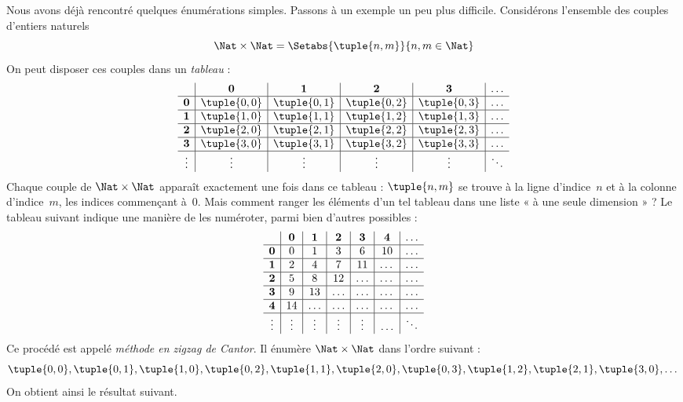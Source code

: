 \documentclass[11pt,a4paper,openany]{memoir}
\begin{document}
\begin{explain}
Nous avons déjà rencontré quelques énumérations simples. Passons
à un exemple un peu plus difficile. Considérons l’ensemble des couples
d’entiers naturels
\[
\Nat \times \Nat = \Setabs{\tuple{n,m}}{n,m \in \Nat}
\]
On peut disposer ces couples dans un \emph{tableau} :
\[
\begin{array}{ c | c | c | c | c | c}
& \mathbf 0 & \mathbf 1 & \mathbf 2 & \mathbf 3 & \dots \\
\hline
\mathbf 0 & \tuple{0,0} & \tuple{0,1} & \tuple{0,2} & \tuple{0,3} & \dots \\
\hline
\mathbf 1 & \tuple{1,0} & \tuple{1,1} & \tuple{1,2} & \tuple{1,3} & \dots \\
\hline
\mathbf 2 & \tuple{2,0} & \tuple{2,1} & \tuple{2,2} & \tuple{2,3} & \dots \\
\hline
\mathbf 3 & \tuple{3,0} & \tuple{3,1} & \tuple{3,2} & \tuple{3,3} & \dots \\
\hline
\vdots & \vdots & \vdots & \vdots & \vdots & \ddots\\
\end{array}
\]
Chaque couple de $\Nat \times \Nat$ apparaît exactement une fois
dans ce tableau : $\tuple{n,m}$ se trouve à la ligne d’indice~$n$
et à la colonne d’indice~$m$, les indices commençant à~$0$.
Mais comment ranger les éléments d’un tel tableau dans une liste
« à une seule dimension » ? Le tableau suivant indique une manière
de les numéroter, parmi bien d’autres possibles :
\[
\begin{array}{ c | c | c | c | c | c | c}
& \mathbf 0 & \mathbf 1 & \mathbf 2 & \mathbf 3 & \mathbf 4 &\dots \\
\hline
\mathbf 0 & 0  & 1& 3 & 6& 10 &\ldots \\
\hline
\mathbf 1 &2 & 4& 7 & 11 & \dots &\ldots \\
\hline
\mathbf 2 & 5 & 8 & 12 & \ldots & \dots&\ldots \\
\hline
\mathbf 3 & 9 & 13 & \ldots & \ldots & \dots & \ldots \\
\hline
\mathbf 4 & 14 & \ldots & \ldots & \ldots & \dots & \ldots \\
\hline
\vdots & \vdots & \vdots & \vdots & \vdots&\ldots & \ddots\\
\end{array}
\]\noindent
Ce procédé est appelé \emph{méthode en zigzag de Cantor}.
Il énumère $\Nat \times \Nat$ dans l’ordre suivant :
\[
\tuple{0,0}, \tuple{0,1}, \tuple{1,0}, \tuple{0,2}, \tuple{1,1},
\tuple{2,0}, \tuple{0,3}, \tuple{1,2}, \tuple{2,1}, \tuple{3,0}, \dots
\]
On obtient ainsi le résultat suivant.
\end{explain}
\end{document}
